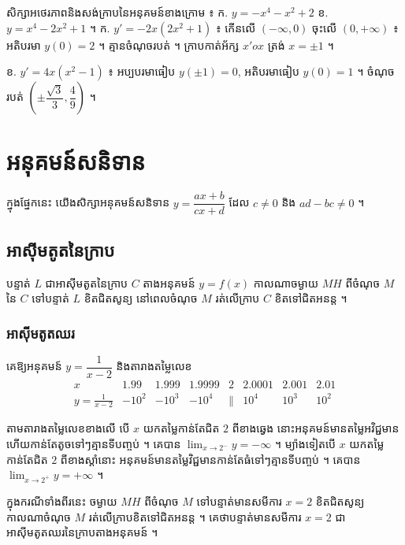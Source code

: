 \begin{pro}
សិក្សាអថេរភាពនិងសង់ក្រាបនៃអនុគមន៍ខាងក្រោម ៖ \quad ក. $y = -x^4 - x^2 + 2$ \quad ខ. $y = x^4 - 2x^2 + 1$ ។
\ans
ក. $y' = -2x(2x^2 + 1)$ ៖ កើនលើ $(-\infty, 0)$ ចុះលើ $(0, +\infty)$ ៖ អតិបរមា $y(0) = 2$ ។ គ្មានចំណុចរបត់ ។ ក្រាបកាត់អ័ក្ស $x'ox$ ត្រង់ $x = \pm 1$ ។

ខ. $y' = 4x(x^2 - 1)$ ៖ អប្បបរមាធៀប $y(\pm 1) = 0$, អតិបរមាធៀប $y(0) = 1$ ។ ចំណុចរបត់ $\left(\pm\dfrac{\sqrt{3}}{3}, \dfrac{4}{9}\right)$ ។
\end{pro}

\section{អនុគមន៍សនិទាន}

ក្នុងផ្នែកនេះ យើងសិក្សាអនុគមន៍សនិទាន $y = \dfrac{ax + b}{cx + d}$ ដែល $c \ne 0$ និង $ad - bc \ne 0$ ។
\subsection{អាស៊ីមតូតនៃក្រាប}

\begin{definition}[និយមន័យ]
បន្ទាត់ $L$ ជាអាស៊ីមតូតនៃក្រាប $C$ តាងអនុគមន៍ $y = f(x)$ កាលណាចម្ងាយ $MH$ ពីចំណុច $M$ នៃ $C$ ទៅបន្ទាត់ $L$ ខិតជិតសូន្យ នៅពេលចំណុច $M$ រត់លើក្រាប $C$ ខិតទៅជិតអនន្ត ។
\end{definition}

\subsubsection{អាស៊ីមតូតឈរ}

\begin{example}[ឧទាហរណ៍]
គេឱ្យអនុគមន៍ $y = \dfrac{1}{x - 2}$ និងតារាងតម្លៃលេខ
\[
\begin{array}{c|ccc|c|ccc}
x & 1.99 & 1.999 & 1.9999 & 2 & 2.0001 & 2.001 & 2.01\\ \hline
y = \frac{1}{x - 2} & -10^2 & -10^3 & -10^4 & \| & 10^4 & 10^3 & 10^2
\end{array}
\]
\end{example}
តាមតារាងតម្លៃលេខខាងលើ បើ $x$ យកតម្លៃកាន់តែជិត $2$ ពីខាងឆ្វេង នោះអនុគមន៍មានតម្លៃអវិជ្ជមាន ហើយកាន់តែតូចទៅៗគ្មានទីបញ្ចប់ ។ គេបាន $\displaystyle\lim_{x \to 2^-} y = -\infty$ ។ ម្យ៉ាងទៀតបើ $x$ យកតម្លៃកាន់តែជិត $2$ ពីខាងស្ដាំនោះ អនុគមន៍មានតម្លៃវិជ្ជមានកាន់តែធំទៅៗគ្មានទីបញ្ចប់ ។ គេបាន $\displaystyle\lim_{x \to 2^+} y = +\infty$ ។

ក្នុងករណីទាំងពីរនេះ ចម្ងាយ $MH$ ពីចំណុច $M$ ទៅបន្ទាត់មានសមីការ $x = 2$ ខិតជិតសូន្យ កាលណាចំណុច $M$ រត់លើក្រាបខិតទៅជិតអនន្ត ។ គេថាបន្ទាត់មានសមីការ $x = 2$ ជាអាស៊ីមតូតឈរនៃក្រាបតាងអនុគមន៍ ។

